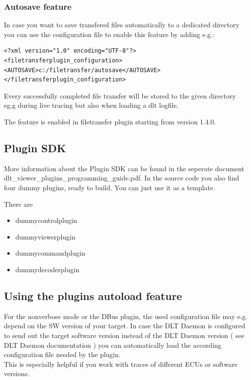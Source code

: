\documentclass[a4paper,11pt]{article}
\begin{document}
\subsubsection{Autosave feature}
In case you want to save transfered files automatically to a dedicated directory you can use the configuration file to
enable this feature by adding e.g.:

\begin{verbatim}
<?xml version="1.0" encoding="UTF-8"?>
<filetransferplugin_configuration>
<AUTOSAVE>c:/filetransfer/autosave</AUTOSAVE>   
</filetransferplugin_configuration>
\end{verbatim}

Every successfully completed file transfer will be stored to the given directory eg.g during live tracing but also when loading 
a dlt logfile.

The feature is enabled in filetransfer plugin starting from version 1.4.0.
\subsection{Plugin SDK}

More information about the Plugin SDK can be found in the seperate document dlt\_viewer\_plugins\_programming\_guide.pdf.
In the source code you also find four dummy plugins, ready to build. You can just use it as a template.

There are
\begin{itemize}
    \item dummycontrolplugin
    \item dummyviewerplugin
    \item dummycommandplugin
    \item dummydecoderplugin
\end{itemize}

\subsection{Using the plugins autoload feature}
\label{usingautoload}
For the nonverbose mode or the DBus plugin, the used configuration file may e.g. depend on the SW version of your target.
In case the DLT Daemon is configured to send out the target software version instead of the DLT Daemon version ( see DLT Daemon documentation )
you can automatically load the according configuration file needed by the plugin.\\
This is especially helpful if you work with traces of different ECUs or software versions.
\end{document}
